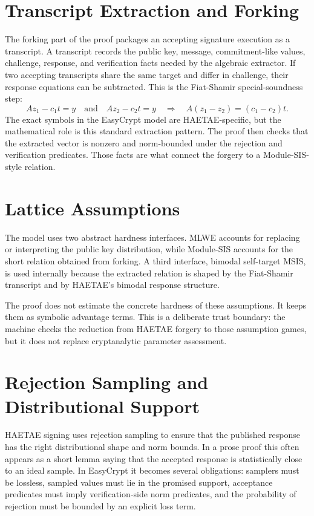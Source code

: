 \documentclass[11pt]{report}
\theoremstyle{definition}
\theoremstyle{plain}
\theoremstyle{definition}
\begin{document}
\section*{Transcript Extraction and Forking}

The forking part of the proof packages an accepting signature execution as a
transcript.  A transcript records the public key, message, commitment-like
values, challenge, response, and verification facts needed by the algebraic
extractor.  If two accepting transcripts share the same target and differ in
challenge, their response equations can be subtracted.  This is the
Fiat-Shamir special-soundness step:
\[
  A z_1 - c_1 t = y
  \quad\text{and}\quad
  A z_2 - c_2 t = y
  \quad\Longrightarrow\quad
  A(z_1-z_2) = (c_1-c_2)t.
\]
The exact symbols in the EasyCrypt model are HAETAE-specific, but the
mathematical role is this standard extraction pattern.  The proof then checks
that the extracted vector is nonzero and norm-bounded under the rejection and
verification predicates.  Those facts are what connect the forgery to a
Module-SIS-style relation.

\section*{Lattice Assumptions}

The model uses two abstract hardness interfaces.  MLWE accounts for replacing
or interpreting the public key distribution, while Module-SIS accounts for the
short relation obtained from forking.  A third interface, bimodal
self-target MSIS, is used internally because the extracted relation is shaped
by the Fiat-Shamir transcript and by HAETAE's bimodal response structure.

The proof does not estimate the concrete hardness of these assumptions.  It
keeps them as symbolic advantage terms.  This is a deliberate trust boundary:
the machine checks the reduction from HAETAE forgery to those assumption games,
but it does not replace cryptanalytic parameter assessment.

\section*{Rejection Sampling and Distributional Support}

HAETAE signing uses rejection sampling to ensure that the published response has
the right distributional shape and norm bounds.  In a prose proof this often
appears as a short lemma saying that the accepted response is statistically
close to an ideal sample.  In EasyCrypt it becomes several obligations:
samplers must be lossless, sampled values must lie in the promised support,
acceptance predicates must imply verification-side norm predicates, and the
probability of rejection must be bounded by an explicit loss term.
\end{document}
